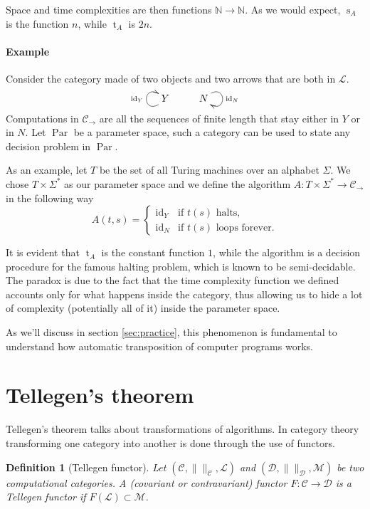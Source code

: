 \documentclass{article}
\newcommand{\cat}[1]{\mathscr{#1}}
\newcommand{\C}{\cat{C}}
\newcommand{\D}{\cat{D}}
\renewcommand{\L}{\cat{L}}
\newcommand{\size}[1]{\lVert#1\rVert}
\DeclareMathOperator{\id}{id}
\newcommand{\N}{\mathbb{N}}
\newcommand{\ra}{\rightarrow}
\DeclareMathOperator{\Time}{t}
\DeclareMathOperator{\Space}{s}
\DeclareMathOperator{\Par}{Par}
\newtheorem{definition}{Definition}
\begin{document}
  Space and time complexities are then functions $\N\ra\N$. As we
  would expect, $\Space_A$ is the function $n$, while $\Time_A$ is
  $2n$.


  \paragraph{Example}
  Consider the category made of two objects and two arrows that are
  both in $\L$.
  \[\xymatrix{ Y \ar@(dl,ul)^{\id_Y} & N \ar@(ur,dr)^{\id_N} }\]
  Computations in $\C_\ra$ are all the sequences of finite length that
  stay either in $Y$ or in $N$. Let $\Par$ be a parameter space, such
  a category can be used to state any decision problem in $\Par$.

  As an example, let $T$ be the set of all Turing machines over an
  alphabet $\Sigma$. We chose $T\times\Sigma^\ast$ as our parameter
  space and we define the algorithm ${A:T\times\Sigma^\ast\ra\C_\ra}$ in
  the following way
  \begin{equation*}
    A(t,s) = \begin{cases}
      \id_Y & \text{if $t(s)$ halts,}\\
      \id_N & \text{if $t(s)$ loops forever.}
    \end{cases}
  \end{equation*}
  
  It is evident that $\Time_A$ is the constant function $1$, while the
  algorithm is a decision procedure for the famous halting problem,
  which is known to be semi-decidable. The paradox is due to the fact
  that the time complexity function we defined accounts only for what
  happens inside the category, thus allowing us to hide a lot of
  complexity (potentially all of it) inside the parameter space.

  As we'll discuss in section \ref{sec:practice}, this phenomenon is
  fundamental to understand how automatic transposition of computer
  programs works.


  \section{Tellegen's theorem}

  Tellegen's theorem talks about transformations of algorithms. In
  category theory transforming one category into another is done
  through the use of functors.

  \begin{definition}[Tellegen functor]
    Let $(\C,\size{}_{\C},\L)$ and $(\D,\size{}_{\D},\cat{M})$ be two
    computational categories. A (covariant or contravariant) functor
    $F:\C\ra\D$ is a \emph{Tellegen functor} if $F(\L)\subset\cat{M}$.
  \end{definition}
\end{document}
